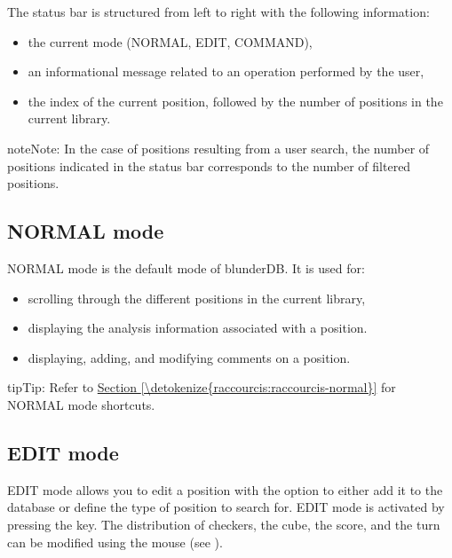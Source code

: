 \documentclass[letterpaper,10pt,english]{sphinxmanual}
\begin{document}
\sphinxAtStartPar
The status bar is structured from left to right with the following information:
\begin{itemize}
\item {} 
\sphinxAtStartPar
the current mode (NORMAL, EDIT, COMMAND),

\item {} 
\sphinxAtStartPar
an informational message related to an operation performed by the user,

\item {} 
\sphinxAtStartPar
the index of the current position, followed by the number of positions in the current library.

\end{itemize}

\begin{sphinxadmonition}{note}{Note:}
\sphinxAtStartPar
In the case of positions resulting from a user search, the number of positions indicated in the status bar corresponds to the number of filtered positions.
\end{sphinxadmonition}


\subsection{NORMAL mode}
\label{\detokenize{manuel:le-mode-normal}}\label{\detokenize{manuel:mode-normal}}
\sphinxAtStartPar
NORMAL mode is the default mode of blunderDB. It is used for:
\begin{itemize}
\item {} 
\sphinxAtStartPar
scrolling through the different positions in the current library,

\item {} 
\sphinxAtStartPar
displaying the analysis information associated with a position.

\item {} 
\sphinxAtStartPar
displaying, adding, and modifying comments on a position.

\end{itemize}

\begin{sphinxadmonition}{tip}{Tip:}
\sphinxAtStartPar
Refer to \hyperref[\detokenize{raccourcis:raccourcis-normal}]{Section \ref{\detokenize{raccourcis:raccourcis-normal}}} for NORMAL mode shortcuts.
\end{sphinxadmonition}


\subsection{EDIT mode}
\label{\detokenize{manuel:le-mode-edit}}\label{\detokenize{manuel:mode-edit}}
\sphinxAtStartPar
EDIT mode allows you to edit a position with the option to either add it to the database or define the type of position to search for. EDIT mode is activated by pressing the  key. The distribution of checkers, the cube, the score, and the turn can be modified using the mouse (see {\hyperref[\detokenize{guide_utilisateur:guide-edit-position}]{}}).
\end{document}

